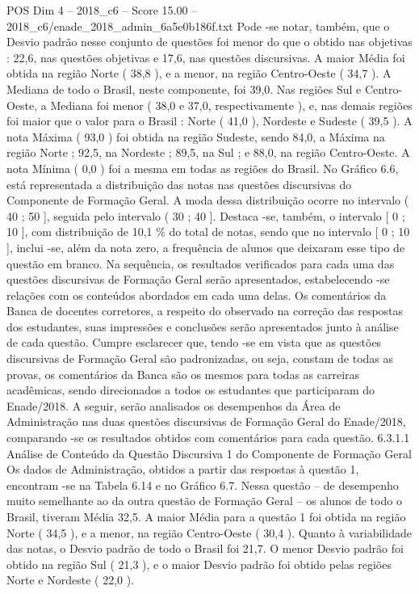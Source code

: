\begin{textsample}{POS Dim 4 – 2018\_c6 – Score 15.00 – 2018\_c6/enade\_2018\_admin\_6a5e0b186f.txt}
Pode -se notar, também, que o Desvio padrão nesse conjunto de questões foi menor do que o obtido nas objetivas : 22,6, nas questões objetivas e 17,6, nas questões discursivas.
A maior Média foi obtida na região Norte ( 38,8 ), e a menor, na região Centro-Oeste ( 34,7 ).
A Mediana de todo o Brasil, neste componente, foi 39,0.
Nas regiões Sul e Centro-Oeste, a Mediana foi menor ( 38,0 e 37,0, respectivamente ), e, nas demais regiões foi maior que o valor para o Brasil : Norte ( 41,0 ), Nordeste e Sudeste ( 39,5 ).
A nota Máxima ( 93,0 ) foi obtida na região Sudeste, sendo 84,0, a Máxima na região Norte ; 92,5, na Nordeste ; 89,5, na Sul ; e 88,0, na região Centro-Oeste.
A nota Mínima ( 0,0 ) foi a mesma em todas as regiões do Brasil.
No Gráfico 6.6, está representada a distribuição das notas nas questões discursivas do Componente de Formação Geral.
A moda dessa distribuição ocorre no intervalo ( 40 ; 50 ], seguida pelo intervalo ( 30 ; 40 ].
Destaca -se, também, o intervalo [ 0 ; 10 ], com distribuição de 10,1 \% do total de notas, sendo que no intervalo [ 0 ; 10 ], inclui -se, além da nota zero, a frequência de alunos que deixaram esse tipo de questão em branco.
Na sequência, os resultados verificados para cada uma das questões discursivas de Formação Geral serão apresentados, estabelecendo -se relações com os conteúdos abordados em cada uma delas.
Os comentários da Banca de docentes corretores, a respeito do observado na correção das respostas dos estudantes, suas impressões e conclusões serão apresentados junto à análise de cada questão.
Cumpre esclarecer que, tendo -se em vista que as questões discursivas de Formação Geral são padronizadas, ou seja, constam de todas as provas, os comentários da Banca são os mesmos para todas as carreiras acadêmicas, sendo direcionados a todos os estudantes que participaram do Enade/2018.
A seguir, serão analisados os desempenhos da Área de Administração nas duas questões discursivas de Formação Geral do Enade/2018, comparando -se os resultados obtidos com comentários para cada questão. 6.3.1.1 Análise de Conteúdo da Questão Discursiva 1 do Componente de Formação Geral Os dados de Administração, obtidos a partir das respostas à questão 1, encontram -se na Tabela 6.14 e no Gráfico 6.7.
Nessa questão – de desempenho muito semelhante ao da outra questão de Formação Geral – os alunos de todo o Brasil, tiveram Média 32,5.
A maior Média para a questão 1 foi obtida na região Norte ( 34,5 ), e a menor, na região Centro-Oeste ( 30,4 ).
Quanto à variabilidade das notas, o Desvio padrão de todo o Brasil foi 21,7.
O menor Desvio padrão foi obtido na região Sul ( 21,3 ), e o maior Desvio padrão foi obtido pelas regiões Norte e Nordeste ( 22,0 ).

\end{textsample}
